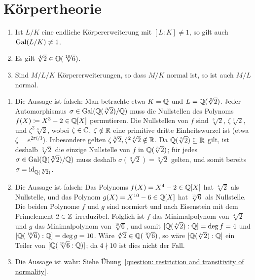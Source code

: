 \section{Körpertheorie}




\begin{question}[subtitle = Multiple Choice]
  \begin{enumerate}
    \item
      Ist $L/K$ eine endliche Körpererweiterung mit $[L : K] \neq 1$, so gilt auch $\operatorname{Gal}(L/K) \neq 1$.
    \item
      Es gilt $\sqrt[4]{2} \in \mathbb{Q}(\sqrt[10]{6})$.
    \item
      Sind $M/L/K$ Körpererweiterungen, so dass $M/K$ normal ist, so ist auch $M/L$ normal.
  \end{enumerate}
\end{question}


\begin{solution}
  \begin{enumerate}
    \item
      Die Aussage ist falsch:
      Man betrachte etwa $K = \mathbb{Q}$ und $L = \mathbb{Q}(\sqrt[3]{2})$.
      Jeder Automorphismus $\sigma \in \operatorname{Gal}(\mathbb{Q}(\sqrt[3]{2})/\mathbb{Q})$ muss die Nullstellen des Polynoms $f(X) \coloneqq X^3-2 \in \mathbb{Q}[X]$ permutieren.
      Die Nullstellen von $f$ sind $\sqrt[3]{2}$, $\zeta \sqrt[3]{2}$, und $\zeta^2 \sqrt[3]{2}$, wobei $\zeta \in \mathbb{C}$, $\zeta \notin \mathbb{R}$ eine primitive dritte Einheitswurzel ist (etwa $\zeta = e^{2 \pi i/3}$).
      Inbesondere gelten $\zeta \sqrt[3]{2}, \zeta^2 \sqrt[3]{2} \notin \mathbb{R}$.
      Da $\mathbb{Q}(\sqrt[3]{2}) \subseteq \mathbb{R}$ gilt, ist deshalb $\sqrt[3]{2}$ die einzige Nullstelle von $f$ in $\mathbb{Q}(\sqrt[3]{2})$;
      für jedes $\sigma \in \operatorname{Gal}(\mathbb{Q}(\sqrt[3]{2})/\mathbb{Q})$ muss deshalb $\sigma(\sqrt[3]{2}) = \sqrt[3]{2}$ gelten, und somit bereits $\sigma = \operatorname{id}_{\mathbb{Q}(\sqrt[3]{2})}$.
      
    \item
      Die Aussage ist falsch:
      Das Polynoms $f(X) = X^4 - 2 \in \mathbb{Q}[X]$ hat $\sqrt[4]{2}$ als Nullstelle, und das Polynom $g(X) = X^{10} - 6 \in \mathbb{Q}[X]$ hat $\sqrt[10]{6}$ als Nullstelle.
      Die beiden Polynome $f$ und $g$ sind normiert und nach Eisenstein mit dem Primelement $2 \in \mathbb{Z}$ irreduzibel.
      Folglich ist $f$ das Minimalpolynom von $\sqrt[4]{2}$ und $g$ das Minimalpolynom von $\sqrt[10]{6}$, und somit $[\mathbb{Q}(\sqrt[4]{2}) : \mathbb{Q}] = \deg f = 4$ und $[\mathbb{Q}(\sqrt[10]{6}) : \mathbb{Q}] = \deg g = 10$.
      Wäre $\sqrt[4]{2} \in \mathbb{Q}(\sqrt[10]{6})$, so wäre $[\mathbb{Q}(\sqrt[4]{2}) : \mathbb{Q}]$ ein Teiler von $[\mathbb{Q}(\sqrt[10]{6} : \mathbb{Q})]$; da $4 \nmid 10$ ist dies nicht der Fall.
      
    \item
      Die Aussage ist wahr:
      Siehe Übung~\ref{question: restriction and transitivity of normality}.
  \end{enumerate}
\end{solution}


